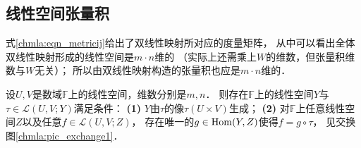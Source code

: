 \subsection{线性空间张量积}
式\eqref{chmla:eqn_metricij}给出了双线性映射所对应的度量矩阵，
从中可以看出全体双线性映射形成的线性空间是$m\cdot n$维的
（实际上还需乘上$W$的维数，但张量积维数与$W$无关）；
所以由双线性映射构造的张量积也应是$m\cdot n$维的．

\begin{theorem}\label{chmla:thm_jicunzai}
    设$U,V$是数域$\mathbb{F}$上的线性空间，维数分别是$m,n$．
    则存在$\mathbb{F}$上的线性空间$Y$与$\tau \in \mathscr{L}(U,V;Y)$满足条件：
    {\bfseries (1)} $Y$由$\tau$的像$\tau(U\times V)$生成；
    {\bfseries (2)} 对$\mathbb{F}$上任意线性空间$Z$以及任意$f \in \mathscr{L}(U,V;Z)$，
    存在唯一的$g\in {\rm Hom}(Y,Z)$使得$f=g \circ \tau$，
    见交换图\ref{chmla:pic_exchange1}．
\end{theorem}
